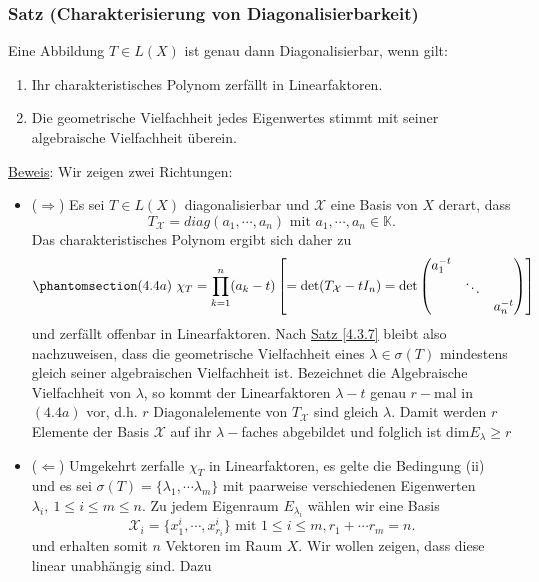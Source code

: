 \subsubsection{Satz (Charakterisierung von Diagonalisierbarkeit)}
\label{4.4.3}
Eine Abbildung $T\in L(X)$ ist genau dann Diagonalisierbar, wenn gilt:
\renewcommand{\labelenumi}{(\roman{enumi})}
\begin{enumerate}
\item Ihr charakteristisches Polynom zerfällt in Linearfaktoren.
\item Die geometrische Vielfachheit jedes Eigenwertes stimmt mit seiner algebraische Vielfachheit überein.
\end{enumerate}
\underline{Beweis}:
Wir zeigen zwei Richtungen:
\renewcommand{\labelitemi}{}
\begin{itemize}
\item ($\Rightarrow$) Es sei $T\in L(X)$ diagonalisierbar und $\mathcal{X}$ eine Basis von $X$ derart, dass \[T_\mathcal{X}=diag(a_1,\cdots ,a_n)\text{ mit }a_1,\cdots ,a_n\in\mathbb{K}.\]  Das charakteristisches Polynom ergibt sich daher zu 
\[\phantomsection\label{4.4a}(4.4a)\ \chi _T=\prod _{k=1}^n (a_k -t)\left[=\mathrm{det}(T_\mathcal{X}-tI_n)=\mathrm{det}\begin{pmatrix}a_1^{-t} & \ & \ \\ \ & \ddots & \ \\ \ & \ & a_n^{-t}\end{pmatrix}\right]\]
und zerfällt offenbar in Linearfaktoren.  Nach \hyperref[4.3.7]{Satz \ref{4.3.7}} bleibt also nachzuweisen, dass die geometrische Vielfachheit eines $\lambda \in \sigma (T)$ mindestens gleich seiner algebraischen Vielfachheit ist.  Bezeichnet die Algebraische Vielfachheit von $\lambda$, so kommt der Linearfaktoren $\lambda -t$ genau $r-$mal in \hyperref[4.4a]{$(4.4a)$} vor, d.h. $r$ Diagonalelemente von $T_\mathcal{X}$ sind gleich $\lambda$.  Damit werden $r$ Elemente der Basis $\mathcal{X}$ auf ihr $\lambda -$faches abgebildet und folglich ist dim$E_\lambda \geq r$
\item ($\Leftarrow$) Umgekehrt zerfalle $\chi _T$ in Linearfaktoren, es gelte die Bedingung (ii) und es sei $\sigma (T)=\{\lambda _1,\cdots \lambda _m\}$ mit paarweise verschiedenen Eigenwerten $\lambda _i,\ 1\leq i\leq m\leq n$.  Zu jedem Eigenraum $E_{\lambda _i}$ wählen wir eine Basis
\[\mathcal{X}_i=\{x_1^i,\cdots ,x_{r_i}^i\}\text{ mit }1\leq i\leq m,r_1+\cdots r_m=n.\]
und erhalten somit $n$ Vektoren im Raum $X$.  Wir wollen zeigen, dass diese linear unabhängig sind.  Dazu 

\end{itemize}
